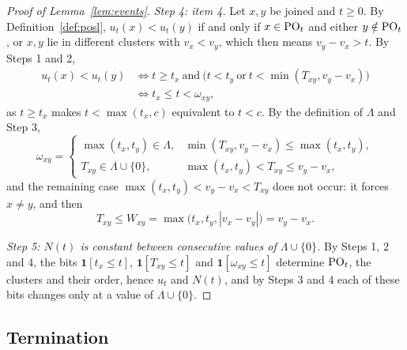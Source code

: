 \begin{proof}[Proof of Lemma~\ref{lem:events}]
\emph{Step 4: item 4.}  Let $x,y$ be joined and $t\ge0$.  By
Definition~\ref{def:posl}, $u_t(x)<u_t(y)$ if and only if $x\in\mathrm{PO}_t$ and either
$y\notin\mathrm{PO}_t$, or $x,y$ lie in different clusters with $v_x<v_y$, which then means
$v_y-v_x>t$.  By Steps 1 and 2,
\[
  \begin{aligned}
  u_t(x)<u_t(y)&\iff t\ge t_x\ \text{and}\
  \bigl(t<t_y\ \text{or}\ t<\min(T_{xy},v_y-v_x)\bigr)\\
  &\iff t_x\le t<\omega_{xy},
  \end{aligned}
\]
as $t\ge t_x$ makes $t<\max(t_x,c)$ equivalent to $t<c$.  By the definition of
$\Lambda$ and Step 3,
\[
  \omega_{xy}=\begin{cases}
    \max(t_x,t_y)\in\Lambda,&\min(T_{xy},v_y-v_x)\le\max(t_x,t_y),\\
    T_{xy}\in\Lambda\cup\{0\},&\max(t_x,t_y)<T_{xy}\le v_y-v_x,
  \end{cases}
\]
and the remaining case $\max(t_x,t_y)<v_y-v_x<T_{xy}$ does not occur: it forces
$x\ne y$, and then
\[
  T_{xy}\le W_{xy}=\max\bigl(t_x,t_y,|v_x-v_y|\bigr)=v_y-v_x.
\]

\emph{Step 5: $N(t)$ is constant between consecutive values of $\Lambda\cup\{0\}$.}  By Steps 1, 2 and 4, the bits $\mathbf 1[t_x\le t]$,
$\mathbf 1[T_{xy}\le t]$ and $\mathbf 1[\omega_{xy}\le t]$ determine $\mathrm{PO}_t$, the
clusters and their order, hence $u_t$ and $N(t)$, and by Steps 3 and 4 each of these
bits changes only at a value of $\Lambda\cup\{0\}$.
\end{proof}

\subsection{Termination}
\label{app:term}

